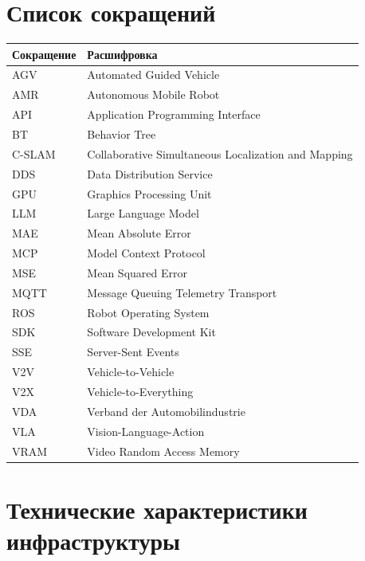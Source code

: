 \documentclass[14pt,a4paper]{extreport}
\begin{document}
\chapter{Список сокращений}

\begin{longtable}{p{3cm}p{10.5cm}}
\toprule
\textbf{Сокращение} & \textbf{Расшифровка} \\
\midrule
\endhead
AGV & Automated Guided Vehicle \\
AMR & Autonomous Mobile Robot \\
API & Application Programming Interface \\
BT & Behavior Tree \\
C-SLAM & Collaborative Simultaneous Localization and Mapping \\
DDS & Data Distribution Service \\
GPU & Graphics Processing Unit \\
LLM & Large Language Model \\
MAE & Mean Absolute Error \\
MCP & Model Context Protocol \\
MSE & Mean Squared Error \\
MQTT & Message Queuing Telemetry Transport \\
ROS & Robot Operating System \\
SDK & Software Development Kit \\
SSE & Server-Sent Events \\
V2V & Vehicle-to-Vehicle \\
V2X & Vehicle-to-Everything \\
VDA & Verband der Automobilindustrie \\
VLA & Vision-Language-Action \\
VRAM & Video Random Access Memory \\
\bottomrule
\end{longtable}

\chapter{Технические характеристики инфраструктуры}
\end{document}
